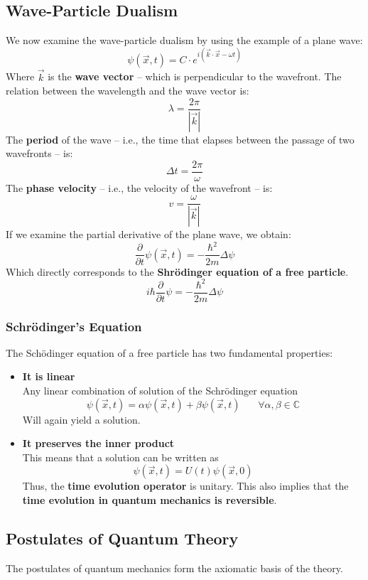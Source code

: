 \documentclass{article}
\begin{document}
\subsection{Wave-Particle Dualism}
We now examine the wave-particle dualism by using the example of a plane wave:
\[ \psi(\overrightarrow x, t) = C \cdot e^{i(\overrightarrow k \cdot \overrightarrow x - \omega t)} \]
Where $\overrightarrow k$ is the \textbf{wave vector} -- which is perpendicular to the wavefront. The relation between the wavelength and the wave vector is:
\[ \lambda = \frac{2\pi}{|\overrightarrow k|} \]
The \textbf{period} of the wave -- i.e., the time that elapses between the passage of two wavefronts -- is:
\[ \Delta t = \frac{2\pi}{\omega} \]
The \textbf{phase velocity} -- i.e., the velocity of the wavefront -- is:
\[ v = \frac{\omega}{|\overrightarrow k|} \]
If we examine the partial derivative of the plane wave, we obtain:
\[ \frac{\partial}{\partial t} \psi(\overrightarrow x, t) = - \frac{\hbar^2}{2m}\Delta\psi \]
Which directly corresponds to the \textbf{Shr\"odinger equation of a free particle}.
\[ i \hbar \frac{\partial}{\partial t} \psi = - \frac{\hbar^2}{2m}\Delta\psi \]

\subsubsection{Schr\"odinger's Equation}
The Sch\"odinger equation of a free particle has two fundamental properties:

\begin{itemize}
	\item \textbf{It is linear} \\
	Any linear combination of solution of the Schr\"odinger equation
	\[ \psi(\overrightarrow x, t) = \alpha\psi(\overrightarrow x, t) + \beta\psi(\overrightarrow x, t) ~~~~~~~~ \forall \alpha, \beta \in \mathbb{C}  \]
	Will again yield a solution.
	
	\item \textbf{It preserves the inner product} \\
	This means that a solution can be written as
	\[ \psi(\overrightarrow x, t) = U(t) \psi(\overrightarrow x, 0) \]
	Thus, the \textbf{time evolution operator} is unitary. This also implies that the \textbf{time evolution in quantum mechanics is reversible}.
\end{itemize}

\subsection{Postulates of Quantum Theory}
The postulates of quantum mechanics form the axiomatic basis of the theory.
\end{document}
